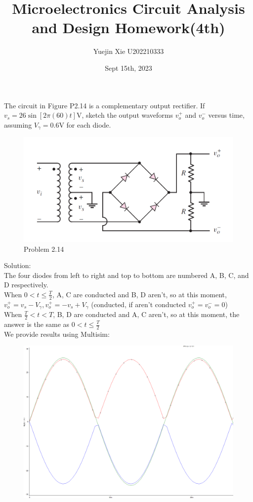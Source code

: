 \documentclass[a4paper,11pt,UTF8]{article}
\title{Microelectronics Circuit Analysis and Design Homework(4th)}
\author{Yuejin Xie \quad U202210333}
\date{Sept 15th, 2023 }
\begin{document}
\maketitle
{} The circuit in Figure P2.14 is a complementary output rectifier. If $v_s = 26
\sin [2\pi(60)t]$V, sketch the output waveforms $ v^+_o $ and $v^-_o $ versus time, assuming
$V_\gamma = 0.6$V for each diode.
\begin{figure}[H] 
	\centering 
	\includegraphics[scale=0.3]{MD2.14.png}
	\caption{Problem 2.14}
\end{figure}
\noindent Solution:\\
The four diodes from left to right and top to bottom are numbered A, B, C, and D respectively.\\
When $\displaystyle 0<t\leq\frac{T}2$, A, C are conducted and B, D aren't, so at this moment, $v^+_o=v_s-V_\gamma,v^+_o=-v_s+V_\gamma$ (conducted, if aren't conducted $v^+_o=v^-_o=0$)\\
When $\displaystyle\frac{T}2<t<T$, B, D are conducted and A, C aren't, so at this moment, the answer is the same as $\displaystyle 0<t\leq\frac{T}2$\\
We provide results using Multisim:
\begin{figure}[H] 
	\centering
	\includegraphics[scale=0.3]{MD2.14_1}
\end{figure}
\end{document}
